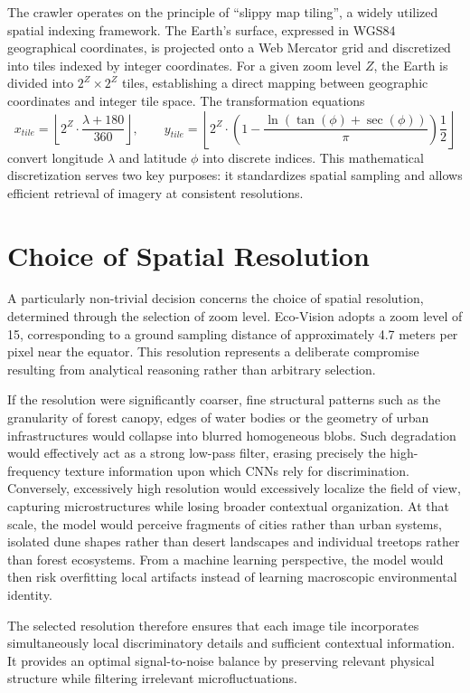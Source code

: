 \documentclass[12pt,a4paper]{report}
\begin{document}
The crawler operates on the principle of “slippy map tiling”, a widely utilized spatial indexing framework. The Earth’s surface, expressed in WGS84 geographical coordinates, is projected onto a Web Mercator grid and discretized into tiles indexed by integer coordinates. For a given zoom level \( Z \), the Earth is divided into \( 2^{Z} \times 2^{Z} \) tiles, establishing a direct mapping between geographic coordinates and integer tile space. The transformation equations
\[
x_{tile} = \left\lfloor 2^{Z} \cdot \frac{\lambda + 180}{360} \right\rfloor, \qquad
y_{tile} = \left\lfloor 2^{Z}\cdot\left(1 - \frac{\ln(\tan(\phi) + \sec(\phi))}{\pi}\right)\frac{1}{2}\right\rfloor
\]
convert longitude \( \lambda \) and latitude \( \phi \) into discrete indices. This mathematical discretization serves two key purposes: it standardizes spatial sampling and allows efficient retrieval of imagery at consistent resolutions.

\section{Choice of Spatial Resolution}

A particularly non-trivial decision concerns the choice of spatial resolution, determined through the selection of zoom level. Eco-Vision adopts a zoom level of 15, corresponding to a ground sampling distance of approximately 4.7 meters per pixel near the equator. This resolution represents a deliberate compromise resulting from analytical reasoning rather than arbitrary selection.

If the resolution were significantly coarser, fine structural patterns such as the granularity of forest canopy, edges of water bodies or the geometry of urban infrastructures would collapse into blurred homogeneous blobs. Such degradation would effectively act as a strong low-pass filter, erasing precisely the high-frequency texture information upon which CNNs rely for discrimination. Conversely, excessively high resolution would excessively localize the field of view, capturing microstructures while losing broader contextual organization. At that scale, the model would perceive fragments of cities rather than urban systems, isolated dune shapes rather than desert landscapes and individual treetops rather than forest ecosystems. From a machine learning perspective, the model would then risk overfitting local artifacts instead of learning macroscopic environmental identity.

The selected resolution therefore ensures that each image tile incorporates simultaneously local discriminatory details and sufficient contextual information. It provides an optimal signal-to-noise balance by preserving relevant physical structure while filtering irrelevant microfluctuations.
\end{document}
